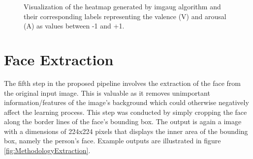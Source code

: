 \begin{figure}[H]
  \hfill
  \hfill
  \caption{Visualization of the heatmap generated by imgaug algorithm \citep{Jung:2020:Imgaug} and their corresponding labels representing the valence (V) and arousal (A) as values between -1 and +1.}
  \label{fig:MethodologyHeatmap}
\end{figure}


\section{Face Extraction}
The fifth step in the proposed pipeline involves the extraction of the face from the original input image. This is valuable as it removes unimportant information/features of the image's background which could otherwise negatively affect the learning process.
\newline\newline
This step was conducted by simply cropping the face along the border lines of the face's bounding box. The output is again a image with a dimensions of 224x224 pixels that displays the inner area of the bounding box, namely the person's face. Example outputs are illustrated in figure \ref{fig:MethodologyExtraction}.

